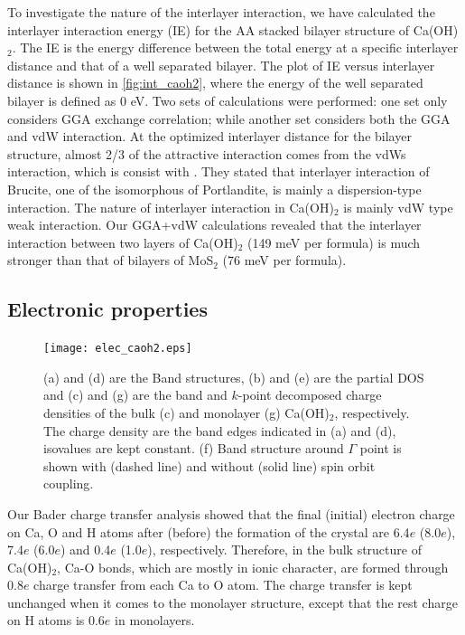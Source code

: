 To investigate the nature of the interlayer interaction, we 
have calculated the interlayer interaction energy (IE) for the AA stacked 
bilayer structure of Ca(OH)$_2$. The IE is the energy difference between the 
total energy at a specific interlayer distance and that of a well
separated bilayer. The plot of IE versus interlayer distance is shown in \autoref{fig:int_caoh2}, where the energy of the  well separated bilayer is defined as 
0 eV. Two sets of calculations were performed: one set only considers GGA 
exchange correlation; while another set considers both the GGA and vdW 
interaction. At the optimized interlayer distance for the bilayer structure, 
almost 2/3 of the attractive interaction comes from the vdWs 
interaction, which is consist with \citet{DArco1993} . They stated that
interlayer interaction of Brucite, one of the isomorphous of Portlandite, is
mainly a dispersion-type interaction. The nature of interlayer interaction in Ca(OH)$_2$ is mainly vdW type weak interaction. Our GGA+vdW calculations revealed that the interlayer interaction between two layers of Ca(OH)$_2$ (149 meV per formula) is much stronger than that of bilayers of MoS$_2$ (76 meV per formula).


\subsection{Electronic properties}\label{sec:electronic}

\begin{figure}[htbp]
\centering
\texttt{[image: elec\_caoh2.eps]}
\caption{\label{fig:elec_caoh2} (a) and (d) are the Band structures, 
(b) and (e) are the partial DOS and (c) and (g) are the band and $k$-point decomposed charge densities of the bulk (c) and monolayer (g) Ca(OH)$_2$, respectively. The charge density are the band edges indicated in (a) and (d), isovalues are kept constant. (f) Band structure around $\Gamma$ point is shown with (dashed line) and without (solid line) spin orbit coupling. }
\end{figure}

Our Bader charge transfer analysis showed that the final (initial) electron 
charge on Ca, O and H atoms after (before) the formation of the crystal are 
6.4$e$ (8.0$e$), 7.4$e$ (6.0$e$) and 0.4$e$ (1.0$e$), respectively. Therefore, 
in the bulk structure of Ca(OH)$_2$, Ca-O bonds, which are 
mostly in ionic character, are formed through 0.8$e$ charge transfer 
from each Ca to O atom.  The charge transfer is kept unchanged when it comes to the monolayer structure, except that the rest charge on H atoms is 0.6$e$ in monolayers.

